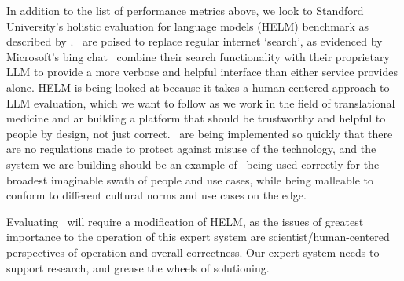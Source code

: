 In addition to the list of performance metrics above, we look to Standford University's holistic evaluation for language models (HELM) benchmark as described by \cite{Liang:2022:helm}.
\llms\ are poised to replace regular internet `search', as evidenced by Microsoft's bing chat~\cite{BingChat:2023} combine their search functionality with their proprietary LLM to provide a more verbose and helpful interface than either service provides alone.
HELM is being looked at because it takes a human-centered approach to LLM evaluation, which we want to follow as we work in the field of translational medicine and ar building a platform that should be trustworthy and helpful to people by design, not just correct.
\llms\ are being implemented so quickly that there are no regulations made to protect against misuse of the technology, and the system we are building should be an example of \llms\ being used correctly for the broadest imaginable swath of people and use cases, while being malleable to conform to different cultural norms and use cases on the edge.

Evaluating \project\ will require a modification of HELM, as the issues of greatest importance to the operation of this expert system are scientist/human-centered perspectives of operation and overall correctness.
Our expert system needs to support research, and grease the wheels of solutioning.



